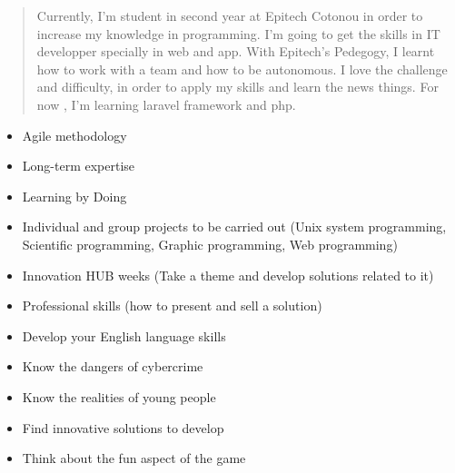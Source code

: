 \documentclass[10pt,a4paper,ragged2e,withhyper]{altacv}
\begin{document}

\makecvheader


\begin{paracol}{2}

\begin{quote}
Currently, I'm student in second year at Epitech Cotonou in order to increase my knowledge in programming. I'm going to get the skills in IT developper specially in web and app. With Epitech's Pedegogy, I learnt how to work with a team and how to be autonomous. I love the challenge and difficulty, in order to apply my skills and learn the news  things. For now , I'm learning laravel framework and php.
\end{quote}


\begin{itemize}
\item Agile methodology
\item Long-term expertise
\item Learning by Doing
\item Individual and group projects to be carried out (Unix system programming, Scientific programming, Graphic programming, Web programming)
\item Innovation HUB weeks (Take a theme and develop solutions related to it)
\item Professional skills (how to present and sell a solution)
\item Develop your English language skills
\end{itemize}


\begin{itemize}
\item Know the dangers of cybercrime
\item Know the realities of young people
\item Find innovative solutions to develop
\item Think about the fun aspect of the game
\end{itemize}


\end{paracol}
\end{document}
